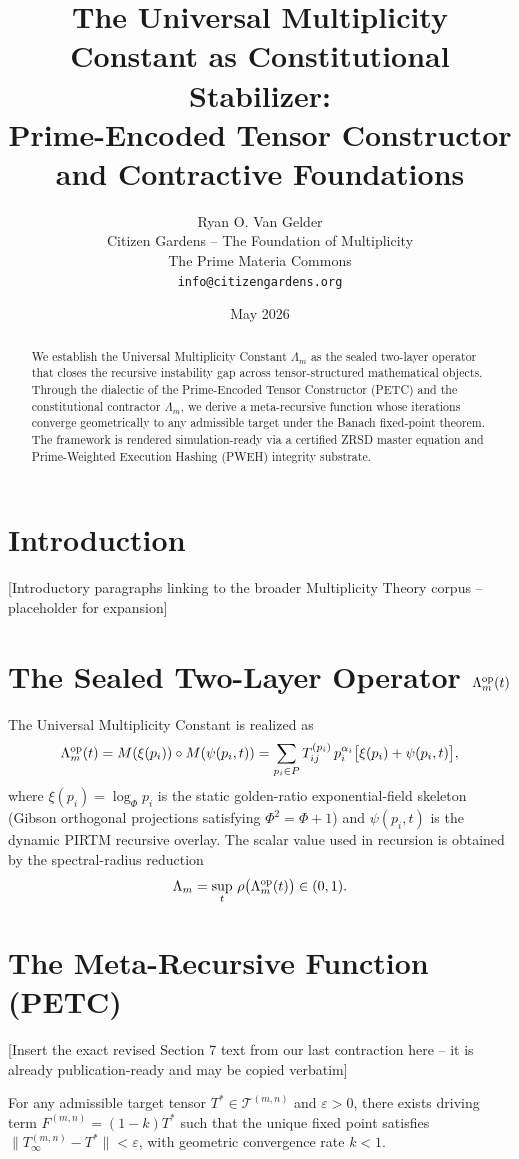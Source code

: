 \documentclass[11pt, a4paper]{article}
\title{The Universal Multiplicity Constant as Constitutional Stabilizer:\\ Prime-Encoded Tensor Constructor and Contractive Foundations}
\author{Ryan O. Van Gelder \\ Citizen Gardens -- The Foundation of Multiplicity \\ The Prime Materia Commons \\ \texttt{info@citizengardens.org}}
\date{May 2026}
\begin{document}
\maketitle
\begin{abstract}
We establish the Universal Multiplicity Constant \(\Lambda_m\) as the sealed two-layer operator that closes the recursive instability gap across tensor-structured mathematical objects. Through the dialectic of the Prime-Encoded Tensor Constructor (PETC) and the constitutional contractor \(\Lambda_m\), we derive a meta-recursive function whose iterations converge geometrically to any admissible target under the Banach fixed-point theorem. The framework is rendered simulation-ready via a certified ZRSD master equation and Prime-Weighted Execution Hashing (PWEH) integrity substrate.
\end{abstract}

\section{Introduction}
[Introductory paragraphs linking to the broader Multiplicity Theory corpus -- placeholder for expansion]

\section{The Sealed Two-Layer Operator \(\Lambda_m^{\rm op}(t)\)}
The Universal Multiplicity Constant is realized as
\[
\Lambda_m^{\rm op}(t) = M(\xi(p_i)) \circ M(\psi(p_i,t)) = \sum_{p_i \in P} T_{ij}^{(p_i)} \, p_i^{\alpha_i} \bigl[ \xi(p_i) + \psi(p_i,t) \bigr],
\]
where \(\xi(p_i) = \log_\Phi p_i\) is the static golden-ratio exponential-field skeleton (Gibson orthogonal projections satisfying \(\Phi^2 = \Phi + 1\)) and \(\psi(p_i,t)\) is the dynamic PIRTM recursive overlay. The scalar value used in recursion is obtained by the spectral-radius reduction
\[
\Lambda_m = \sup_t \, \rho\bigl( \Lambda_m^{\rm op}(t) \bigr) \in (0,1).
\]

\section{The Meta-Recursive Function (PETC)}
[Insert the exact revised Section 7 text from our last contraction here -- it is already publication-ready and may be copied verbatim]

\begin{theorem}
For any admissible target tensor \(T^* \in \mathcal{T}^{(m,n)}\) and \(\varepsilon > 0\), there exists driving term \(F^{(m,n)} = (1-k)T^*\) such that the unique fixed point satisfies \(\|T_\infty^{(m,n)} - T^*\| < \varepsilon\), with geometric convergence rate \(k < 1\).
\end{theorem}
\end{document}
